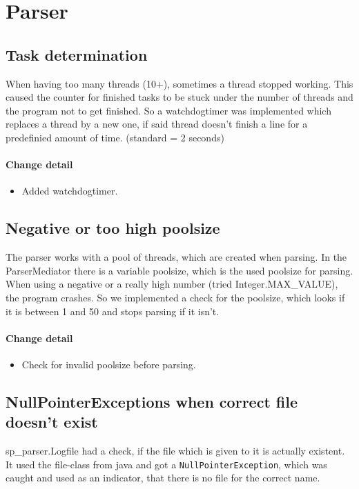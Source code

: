 \section{Parser}

\subsection{Task determination} 
When having too many threads (10+), sometimes a thread stopped working. This caused the counter for finished tasks
to be stuck under the number of threads and the program not to get finished.
So a watchdogtimer was implemented which replaces a thread by a new one, if said thread doesn't finish a line for a 
predefinied amount of time. (standard = 2 seconds)

\paragraph{Change detail}
\begin{itemize}
  \item Added watchdogtimer.
\end{itemize}

\subsection{Negative or too high poolsize}
The parser works with a pool of threads, which are created when parsing. In the ParserMediator there is
a variable poolsize, which is the used poolsize for parsing.
When using a negative or a really high number (tried Integer.MAX\_VALUE), the program crashes. 
So we implemented a check for the poolsize, which looks if it is between 1 and 50 and stops parsing if it isn't.

\paragraph{Change detail}
\begin{itemize}
  \item Check for invalid poolsize before parsing.
\end{itemize}

\subsection{NullPointerExceptions when correct file doesn't exist}
sp\_parser.Logfile had a check, if the file which is given to it is actually existent. It used the file-class from java
and got a \texttt{NullPointerException}, which was caught and used as an indicator, that there is no file for the correct name.


